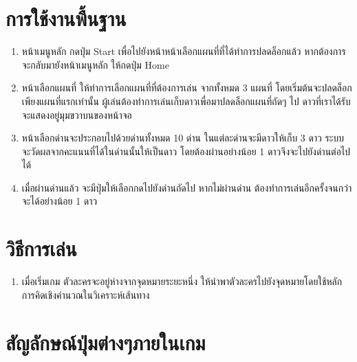 \section{การใช้งานพื้นฐาน}
\begin{enumerate}
    \item หน้าเมนูหลัก กดปุ่ม Start เพื่อไปยังหน้าหน้าเลือกแผนที่ที่ได้ทำการปลดล็อกแล้ว หากต้องการจะกลับมายังหน้าเมนูหลัก ให้กดปุ่ม Home
    \item หน้าเลือกแผนที่ ให้ทำการเลือกแผนที่ที่ต้องการเล่น จากทั้งหมด 3 แผนที่ โดยเริ่มต้นจะปลดล็อกเพียงแผนที่แรกเท่านั้น ผู้เล่นต้องทำการเล่นเก็บดาวเพื่อมาปลดล็อกแผนที่ถัดๆ ไป ดาวที่เราได้รับจะแสดงอยู่มุมขวาบนของหน้าจอ 
    \item หน้าเลือกด่านจะประกอบไปด้วยด่านทั้งหมด 10 ด่าน ในแต่ละด่านจะมีดาวให้เก็บ 3 ดาว ระบบจะวัดผลจากคะแนนที่ได้ในด่านนั้นให้เป็นดาว โดยต้องผ่านอย่างน้อย 1 ดาวจึงจะไปยังด่านต่อไปได้
    \item เมื่อผ่านด่านแล้ว จะมีปุ่มให้เลือกกดไปยังด่านถัดไป หากไม่ผ่านด่าน ต้องทำการเล่นอีกครั้งจนกว่าจะได้อย่างน้อย 1 ดาว
\end{enumerate}

\section{วิธีการเล่น}
\begin{enumerate}
    \item เมื่อเริ่มเกม ตัวละครจะอยู่ห่างจากจุดหมายระยะหนึ่ง ให้นำพาตัวละครไปยังจุดหมายโดยใช้หลักการคิดเชิงคำนวณในวิเคราะห์เส้นทาง 
    
\end{enumerate}

\section{สัญลักษณ์ปุ่มต่างๆภายในเกม}

